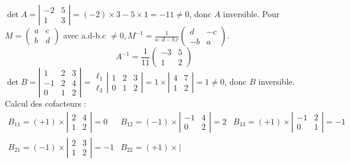 {{$\operatorname{det} A=\left|\begin{array}{cc}-2 & 5 \\ 1 & 3\end{array}\right|=(-2) \times 3-5 \times 1=-11 \neq 0$, donc $A$ inversible.
Pour $M=\left(\begin{array}{ll}a & c \\ b & d\end{array}\right)$ avec a.d-b.c $\neq 0, M^{-1}=\frac{1}{a \cdot d-b . c}\left(\begin{array}{cc}d & -c \\ -b & a\end{array}\right)$.
$$
A^{-1}=\frac{1}{11}\left(\begin{array}{cc}
	-3 & 5 \\
	1 & 2
\end{array}\right)
$$
$\operatorname{det} B=\left|\begin{array}{ccc}1 & 2 & 3 \\ -1 & 2 & 4 \\ 0 & 1 & 2\end{array}\right|=\begin{gathered}\ell_1 \\ \ell_3\end{gathered}\left|\begin{array}{ccc}1 & 2 & 3 \\ 0 & 1 & 2\end{array}\right|=1 \times\left|\begin{array}{ll}4 & 7 \\ 1 & 2\end{array}\right|=1 \neq 0$, donc $B$ inversible.
Calcul des cofacteurs :
$$
\begin{array}{lll}
	B_{11}=(+1) \times\left|\begin{array}{ll}
		2 & 4 \\
		1 & 2
	\end{array}\right|=0 & B_{12}=(-1) \times\left|\begin{array}{cc}
		-1 & 4 \\
		0 & 2
	\end{array}\right|=2 & B_{13}=(+1) \times\left|\begin{array}{cc}
		-1 & 2 \\
		0 & 1
	\end{array}\right|=-1 \\
	B_{21}=(-1) \times\left|\begin{array}{ll}
		2 & 3 \\
		1 & 2
	\end{array}\right|=-1 & B_{22}=(+1) \times\left|\begin{array}{cc}

\end{array}
\end{array}$$}}
